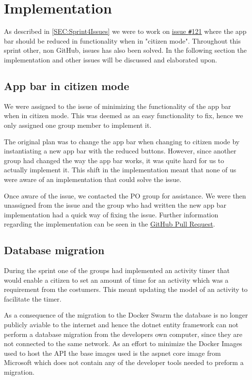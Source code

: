 \section{Implementation}
As described in \autoref{SEC:Sprint4Issues} we were to work on \href{https://github.com/aau-giraf/weekplanner/issues/121}{issue \texttt{\#}121} where the app bar should be reduced in functionality when in "citizen mode". 
Throughout this sprint other, non GitHub, issues has also been solved.
In the following section the implementation and other issues will be discussed and elaborated upon.

\subsection{App bar in citizen mode}
We were assigned to the issue of minimizing the functionality of the app bar when in citizen mode. 
This was deemed as an easy functionality to fix, hence we only assigned one group member to implement it. 

The original plan was to change the app bar when changing to citizen mode by instantiating a new app bar with the reduced buttons. 
However, since another group had changed the way the app bar works, it was quite hard for us to actually implement it.
This shift in the implementation meant that none of us were aware of an implementation that could solve the issue. 

Once aware of the issue, we contacted the PO group for assistance. 
We were then unassigned from the issue and the group who had written the new app bar implementation had a quick way of fixing the issue. 
Further information regarding the implementation can be seen in the \href{https://github.com/aau-giraf/weekplanner/pull/262}{GitHub Pull Request}.

\subsection{Database migration}
During the sprint one of the groups had implemented an activity timer that would enable a citizen to set an amount of time for an activity which was a requirement from the costumers.
This meant updating the model of an activity to facilitate the timer. 

As a consequence of the migration to the Docker Swarm the database is no longer publicly aviable to the internet and hence the dotnet entity framework can not perform a database migration from the developers own computer, since they are not connected to the same network. 
As an effort to minimize the Docker Images used to host the API the base images used is the aspnet core image from Microsoft which does not contain any of the developer tools needed to preform a migration. 

